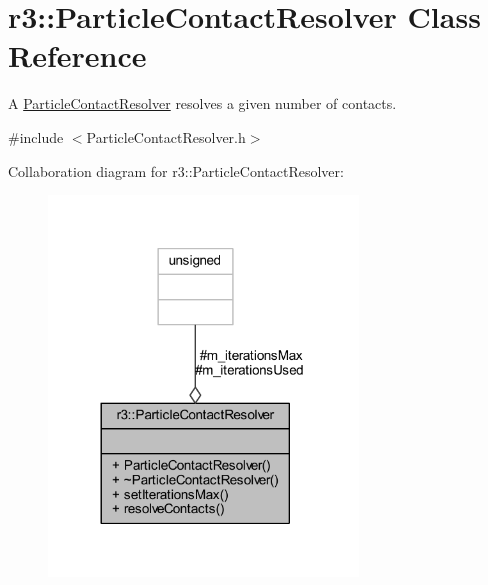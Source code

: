 \hypertarget{classr3_1_1_particle_contact_resolver}{}\section{r3\+:\+:Particle\+Contact\+Resolver Class Reference}
\label{classr3_1_1_particle_contact_resolver}


A \mbox{\hyperlink{classr3_1_1_particle_contact_resolver}{Particle\+Contact\+Resolver}} resolves a given number of contacts.  




{\ttfamily \#include $<$Particle\+Contact\+Resolver.\+h$>$}



Collaboration diagram for r3\+:\+:Particle\+Contact\+Resolver\+:\nopagebreak
\begin{figure}[H]
\begin{center}
\leavevmode
\includegraphics[width=233pt]{classr3_1_1_particle_contact_resolver__coll__graph}
\end{center}
\end{figure}
